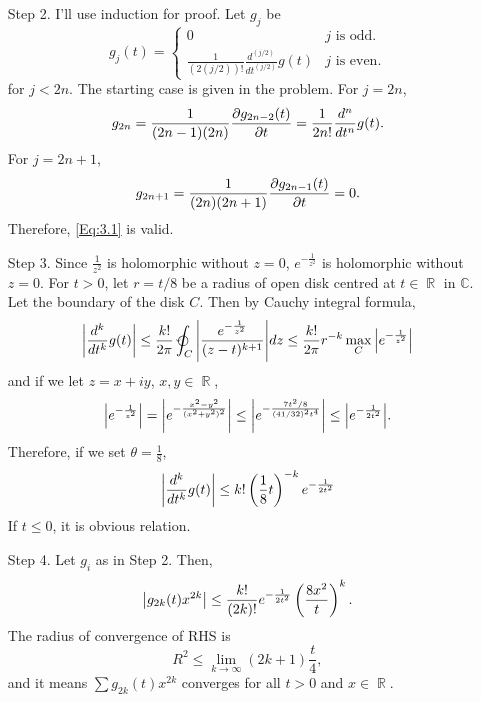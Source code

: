 \documentclass{article}
\DeclareMathOperator{\rr}{\mathbb{R}}
\begin{document}
\begin{enumerate}
\item[Step 2.] I'll use induction for proof. Let $g_j$ be
\begin{equation}\label{Eq:3.1}
g_j(t)=\begin{cases}
0 & j\text{ is odd.} \\
\frac{1}{(2(j/2))!}\frac{d^{(j/2)}}{dt^{(j/2)}}g(t) & j\text{ is even.}
\end{cases}
\end{equation}
for $j<2n$. The starting case is given in the problem. For $j=2n$,
\begin{equation*}
g_{2n}=\frac{1}{(2n-1)(2n)}\pdv{g_{2n-2}(t)}{t}=\frac{1}{2n!}\frac{d^{n}}{dt^{n}}g(t).
\end{equation*}
For $j=2n+1$,
\begin{equation*}
g_{2n+1}=\frac{1}{(2n)(2n+1)}\pdv{g_{2n-1}(t)}{t}=0.
\end{equation*}
Therefore, \eqref{Eq:3.1} is valid.
\item[Step 3.] Since $\frac{1}{z^2}$ is holomorphic without $z= 0$, $e^{-\frac{1}{z^2}}$ is holomorphic without $z=0$.
For $t> 0$, let $r=t/8$ be a radius of open disk centred at $t\in \rr$ in $\mathbb{C}$. Let the boundary of the disk $C$. Then by Cauchy integral formula,
\begin{equation*}
\abs{\frac{d^k}{dt^k}g(t)}\leq \frac{k!}{2\pi}\varointctrclockwise_C \abs{\frac{e^{-\frac{1}{z^2}}}{(z-t)^{k+1}}}dz\leq \frac{k!}{2\pi} r^{-k} \max\limits_C\abs{e^{-\frac{1}{z^2}}}
\end{equation*}
and if we let $z=x+iy$, $x,y\in \rr$,
\begin{equation*}
\abs{e^{-\frac{1}{z^2}}}=\abs{e^{-\frac{x^2-y^2}{(x^2+y^2)^2}}}\leq \abs{e^{-\frac{7t^2/8}{(41/32)^2t^4}}}\leq\abs{e^{-\frac{1}{2t^2}}}.
\end{equation*}
Therefore, if we set $\theta=\frac{1}{8}$,
\begin{equation*}
\abs{\frac{d^k}{dt^k}g(t)}\leq k!\left(\frac{1}{8}t\right)^{-k}e^{-\frac{1}{2t^2}}
\end{equation*}
If $t\leq 0$, it is obvious relation.
\item[Step 4.] Let $g_i$ as in Step 2. Then,
\begin{equation*}
\abs{g_{2k}(t)x^{2k}}\leq \frac{k!}{(2k)!}e^{-\frac{1}{2t^2}}\left(\frac{8x^2}{t}\right)^k.
\end{equation*}
The radius of convergence of RHS is
\begin{equation*}
R^2\leq \lim\limits_{k\rightarrow \infty}(2k+1)\frac{t}{4},
\end{equation*}
and it means $\sum g_{2k}(t)x^{2k}$ converges for all $t>0$ and $x\in \rr$.


\end{enumerate}
\end{document}
